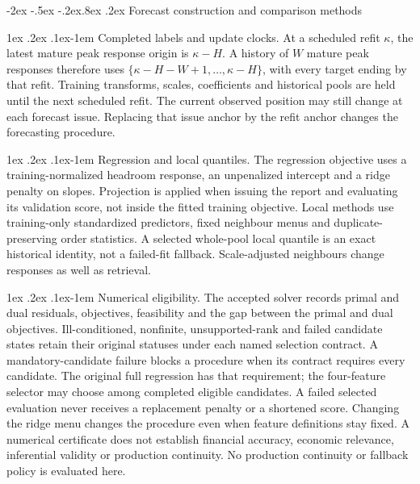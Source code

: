 \documentclass[12pt,a4paper]{article}
\makeatletter
\renewcommand\section{\@startsection{section}{1}{\z@}%
  {-2ex \@plus -.5ex \@minus -.2ex}{.8ex \@plus .2ex}%
  {\normalfont\large\bfseries}}
\renewcommand\paragraph{\@startsection{paragraph}{4}{\z@}%
  {1ex \@plus .2ex \@minus .1ex}{-1em}%
  {\normalfont\normalsize\bfseries}}
\makeatother
\begin{document}
\FloatBarrier


\section{Forecast construction and comparison methods}\label{sup:ar}\label{sup:rank}\label{sup:wp2}\label{sup:wp3}\label{sup:coherence}\label{sup:implementation}

\paragraph{Completed labels and update clocks.}
At a scheduled refit \(\kappa\), the latest mature peak response origin is
\(\kappa-H\). A history of \(W\) mature peak responses therefore uses
\(\{\kappa-H-W+1,\ldots,\kappa-H\}\), with every target ending by that refit.
Training transforms, scales, coefficients and historical pools are held until
the next scheduled refit. The current observed position may still change at
each forecast issue. Replacing that issue anchor by the refit anchor changes
the forecasting procedure.

\paragraph{Regression and local quantiles.}
The regression objective uses a training-normalized headroom response, an
unpenalized intercept and a ridge penalty on slopes. Projection is applied when
issuing the report and evaluating its validation score, not inside the fitted
training objective. Local methods use training-only standardized predictors,
fixed neighbour menus and duplicate-preserving order statistics. A selected
whole-pool local quantile is an exact historical identity, not a failed-fit
fallback. Scale-adjusted neighbours change responses as well as retrieval.

\paragraph{Numerical eligibility.}
The accepted solver records primal and dual residuals, objectives, feasibility and the gap between the primal and dual objectives. Ill-conditioned, nonfinite, unsupported-rank and failed candidate
states retain their original statuses under each named selection contract.
A mandatory-candidate failure blocks a procedure when its contract requires
every candidate. The original full regression has that requirement; the
four-feature selector may choose among completed eligible candidates. A failed
selected evaluation never receives a replacement penalty or a shortened score.
Changing the ridge menu changes the procedure even when feature definitions
stay fixed. A numerical certificate does not establish financial accuracy,
economic relevance, inferential validity or production continuity.
No production continuity or fallback policy is evaluated here.
\end{document}
